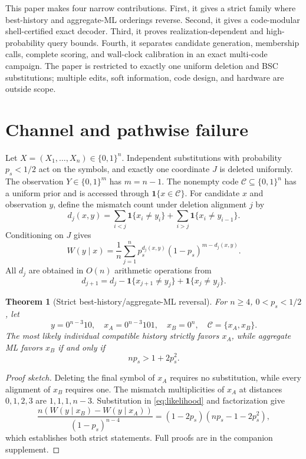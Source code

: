 \documentclass[conference]{IEEEtran}
\newtheorem{theorem}{Theorem}
\newcommand{\C}{\mathcal C}
\newcommand{\one}{\mathbf 1}
\begin{document}
This paper makes four narrow contributions. First, it gives a strict family where best-history and
aggregate-ML orderings reverse. Second, it gives a code-modular shell-certified exact decoder.
Third, it proves realization-dependent and high-probability query bounds. Fourth, it separates
candidate generation, membership calls, complete scoring, and wall-clock calibration in an exact
multi-code campaign. The paper is restricted to exactly one uniform deletion and BSC substitutions;
multiple edits, soft information, code design, and hardware are outside scope.

\section{Channel and pathwise failure}
Let $X=(X_1,\ldots,X_n)\in\{0,1\}^n$. Independent substitutions with probability $p_s<1/2$
act on the symbols, and exactly one coordinate $J$ is deleted uniformly. The observation
$Y\in\{0,1\}^{m}$ has $m=n-1$. The nonempty code $\C\subseteq\{0,1\}^n$ has a uniform prior and is
accessed through $\one\{x\in\C\}$.
For candidate $x$ and observation $y$, define the mismatch count under deletion alignment $j$ by
\begin{equation}
 d_j(x,y)=\sum_{i<j}\one\{x_i\ne y_i\}+\sum_{i>j}\one\{x_i\ne y_{i-1}\}.
\end{equation}
Conditioning on $J$ gives
\begin{equation}
 W(y\mid x)=\frac1n\sum_{j=1}^{n}p_s^{d_j(x,y)}(1-p_s)^{m-d_j(x,y)}. \label{eq:likelihood}
\end{equation}
All $d_j$ are obtained in $O(n)$ arithmetic operations from
\begin{equation}
 d_{j+1}=d_j-\one\{x_{j+1}\ne y_j\}+\one\{x_j\ne y_j\}. \label{eq:slide}
\end{equation}

\begin{theorem}[Strict best-history/aggregate-ML reversal]\label{thm:reversal}
For $n\ge4$, $0<p_s<1/2$, let
\[
 y=0^{n-3}10,\quad x_A=0^{n-3}101,\quad x_B=0^n,\quad \C=\{x_A,x_B\}.
\]
The most likely individual compatible history strictly favors $x_A$, while aggregate ML favors
$x_B$ if and only if
\begin{equation}
 np_s>1+2p_s^2. \label{eq:condition}
\end{equation}
\end{theorem}
\begin{proof}[Proof sketch]
Deleting the final symbol of $x_A$ requires no substitution, while every alignment of $x_B$
requires one. The mismatch multiplicities of $x_A$ at distances $0,1,2,3$ are $1,1,1,n-3$.
Substitution in \eqref{eq:likelihood} and factorization give
\[
 \frac{n(W(y\mid x_B)-W(y\mid x_A))}{(1-p_s)^{n-4}}
 =(1-2p_s)(np_s-1-2p_s^2),
\]
which establishes both strict statements. Full proofs are in the companion supplement.
\end{proof}
\end{document}

